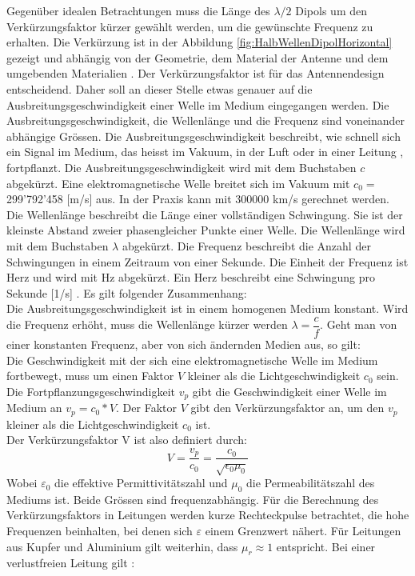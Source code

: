 \newpage
Gegenüber idealen Betrachtungen muss die Länge des $\lambda /2$ Dipols um den Verkürzungsfaktor kürzer gewählt werden, um die gewünschte Frequenz zu erhalten. Die Verkürzung ist in der Abbildung \ref{fig:HalbWellenDipolHorizontal} gezeigt und abhängig von der Geometrie, dem Material der Antenne und dem umgebenden Materialien \cite{Hcuno}.
Der Verkürzungsfaktor ist für das Antennendesign entscheidend. Daher soll an dieser Stelle etwas genauer auf die Ausbreitungsgeschwindigkeit einer Welle im Medium eingegangen werden.
Die Ausbreitungsgeschwindigkeit, die Wellenlänge und die Frequenz sind voneinander abhängige Grössen. 
Die Ausbreitungsgeschwindigkeit beschreibt, wie schnell sich ein Signal im Medium, das heisst im Vakuum, in der Luft oder in einer Leitung , fortpflanzt. Die Ausbreitungsgeschwindigkeit wird mit dem Buchstaben $c$ abgekürzt. Eine elektromagnetische Welle breitet sich im
Vakuum mit $c_0 = $ 299'792’458 [m/s] aus. In der Praxis kann mit 300000 km/s gerechnet werden.
Die Wellenlänge beschreibt die Länge einer vollständigen Schwingung. Sie ist der kleinste Abstand zweier phasengleicher Punkte einer Welle. Die Wellenlänge wird mit dem Buchstaben $\lambda$ abgekürzt. Die Frequenz beschreibt die Anzahl der Schwingungen in einem Zeitraum von einer Sekunde. Die Einheit der Frequenz ist Herz und wird mit Hz abgekürzt. Ein Herz beschreibt eine Schwingung pro Sekunde [1/s] \cite{Verkuertzungsfaktor}.
Es gilt folgender Zusammenhang:\\
Die Ausbreitungsgeschwindigkeit ist in einem homogenen Medium konstant. Wird die Frequenz erhöht, muss die Wellenlänge kürzer werden $\lambda = \dfrac{c}{f}$. Geht man von einer konstanten Frequenz, aber von sich ändernden Medien aus, so gilt: \\
Die Geschwindigkeit mit der sich eine elektromagnetische Welle im Medium fortbewegt, muss um einen Faktor $V$ kleiner als die Lichtgeschwindigkeit $c_0$ sein.\\
Die Fortpflanzungsgeschwindigkeit $v_p$ gibt die Geschwindigkeit einer Welle im Medium an $v_p=c_0*V $. Der Faktor $V$ gibt den Verkürzungsfaktor an, um den $v_p$ kleiner als die Lichtgeschwindigkeit $c_0$ ist. \\
Der Verkürzungsfaktor V ist also definiert durch:
\begin{equation}
V=\dfrac{v_p}{c_0}=\dfrac{c_0}{\sqrt{\epsilon_0 \mu_0}}
\end{equation}
Wobei $\varepsilon_0$ die effektive Permittivitätszahl
 und $\mu_0$ die Permeabilitätszahl des Mediums ist. Beide Grössen sind frequenzabhängig. Für die Berechnung des Verkürzungsfaktors in Leitungen werden kurze Rechteckpulse betrachtet, die hohe Frequenzen beinhalten, bei denen sich $\varepsilon$ einem Grenzwert nähert. Für Leitungen aus Kupfer und Aluminium gilt weiterhin, dass $\mu_r \approx 1$ entspricht. Bei einer verlustfreien Leitung gilt \cite{Verkuertzungsfaktor_wiki}:
